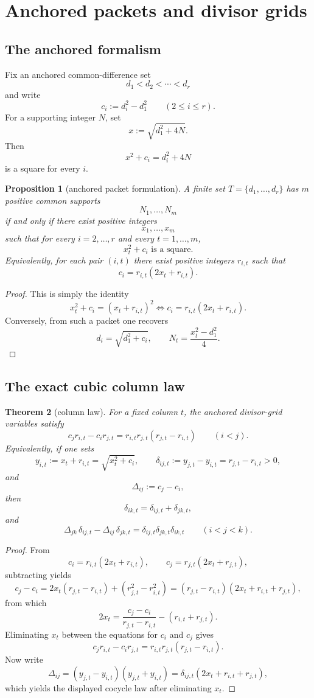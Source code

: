 \documentclass[11pt]{article}
\theoremstyle{plainbreak}
\newtheorem{theorem}{Theorem}[section]
\newtheorem{proposition}[theorem]{Proposition}
\theoremstyle{defbreak}
\begin{document}
\section{Anchored packets and divisor grids}

\subsection{The anchored formalism}

Fix an anchored common-difference set
\[
d_1<d_2<\cdots<d_r
\]
and write
\[
c_i:=d_i^2-d_1^2\qquad (2\le i\le r).
\]
For a supporting integer $N$, set
\[
x:=\sqrt{d_1^2+4N}.
\]
Then
\[
x^2+c_i=d_i^2+4N
\]
is a square for every $i$.

\begin{proposition}[anchored packet formulation]
A finite set $T=\{d_1,\dots,d_r\}$ has $m$ positive common supports
\[
N_1,\dots,N_m
\]
if and only if there exist positive integers
\[
x_1,\dots,x_m
\]
such that for every $i=2,\dots,r$ and every $t=1,\dots,m$,
\[
x_t^2+c_i \text{ is a square}.
\]
Equivalently, for each pair $(i,t)$ there exist positive integers $r_{i,t}$ such that
\[
c_i=r_{i,t}(2x_t+r_{i,t}).
\]
\end{proposition}

\begin{proof}
This is simply the identity
\[
x_t^2+c_i=(x_t+r_{i,t})^2
\iff c_i=r_{i,t}(2x_t+r_{i,t}).
\]
Conversely, from such a packet one recovers
\[
d_i=\sqrt{d_1^2+c_i},\qquad N_t=\frac{x_t^2-d_1^2}{4}.
\]
\end{proof}

\subsection{The exact cubic column law}

\begin{theorem}[column law]
For a fixed column $t$, the anchored divisor-grid variables satisfy
\[
c_j r_{i,t}-c_i r_{j,t}=r_{i,t}r_{j,t}(r_{j,t}-r_{i,t})
\qquad (i<j).
\]
Equivalently, if one sets
\[
y_{i,t}:=x_t+r_{i,t}=\sqrt{x_t^2+c_i},
\qquad
\delta_{ij,t}:=y_{j,t}-y_{i,t}=r_{j,t}-r_{i,t}>0,
\]
and
\[
\Delta_{ij}:=c_j-c_i,
\]
then
\[
\delta_{ik,t}=\delta_{ij,t}+\delta_{jk,t},
\]
and
\[
\Delta_{jk}\,\delta_{ij,t}-\Delta_{ij}\,\delta_{jk,t}
=
\delta_{ij,t}\delta_{jk,t}\delta_{ik,t}
\qquad (i<j<k).
\]
\end{theorem}

\begin{proof}
From
\[
c_i=r_{i,t}(2x_t+r_{i,t}),\qquad c_j=r_{j,t}(2x_t+r_{j,t}),
\]
subtracting yields
\[
c_j-c_i=2x_t(r_{j,t}-r_{i,t})+(r_{j,t}^2-r_{i,t}^2)
=(r_{j,t}-r_{i,t})(2x_t+r_{i,t}+r_{j,t}),
\]
from which
\[
2x_t=\frac{c_j-c_i}{r_{j,t}-r_{i,t}}-(r_{i,t}+r_{j,t}).
\]
Eliminating $x_t$ between the equations for $c_i$ and $c_j$ gives
\[
c_j r_{i,t}-c_i r_{j,t}=r_{i,t}r_{j,t}(r_{j,t}-r_{i,t}).
\]
Now write
\[
\Delta_{ij}=(y_{j,t}-y_{i,t})(y_{j,t}+y_{i,t})=\delta_{ij,t}(2x_t+r_{i,t}+r_{j,t}),
\]
which yields the displayed cocycle law after eliminating $x_t$.
\end{proof}
\end{document}
